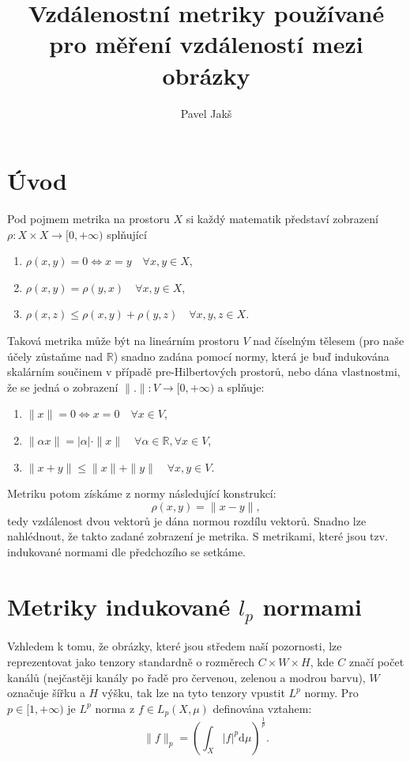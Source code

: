 \documentclass[czech]{article}
\author{Pavel Jakš}
\title{Vzdálenostní metriky používané pro měření vzdáleností mezi obrázky}
\begin{document}
\maketitle

\section*{Úvod}

Pod pojmem metrika na prostoru $X$ si každý matematik představí zobrazení $\rho : X \times X \rightarrow [0, + \infty)$
splňující
\begin{enumerate}
    \item $\rho(x, y) = 0 \iff x = y \quad \forall x, y \in X$,
    \item $\rho(x, y) = \rho(y, x) \quad \forall x, y \in X$,
    \item $\rho(x, z) \leq \rho(x, y) + \rho(y, z) \quad \forall x, y, z \in X$.
\end{enumerate}

Taková metrika může být na lineárním prostoru $V$ nad číselným tělesem (pro naše účely zůstaňme nad $\mathbb{R}$)
snadno zadána pomocí normy,
která je buď indukována skalárním součinem v případě pre-Hilbertových prostorů,
nebo dána vlastnostmi, že se jedná o zobrazení $\|.\| : V \rightarrow [0, + \infty)$
a splňuje:
\begin{enumerate}
    \item $\|x\| = 0 \iff x = 0 \quad \forall x \in V$,
    \item $\|\alpha x\| = |\alpha| \cdot \|x\| \quad \forall \alpha \in \mathbb{R}, \forall x \in V$,
    \item $\|x + y\| \leq \|x\| + \|y\| \quad \forall x, y \in V$.
\end{enumerate}
Metriku potom získáme z normy následující konstrukcí:
\begin{equation*}
    \rho (x, y) = \| x - y \|,
\end{equation*}
tedy vzdálenost dvou vektorů je dána normou rozdílu vektorů.
Snadno lze nahlédnout, že takto zadané zobrazení je metrika.
S metrikami, které jsou tzv. indukované normami dle předchozího se setkáme.


\section{Metriky indukované $l_p$ normami}

Vzhledem k tomu, že obrázky, které jsou středem naší pozornosti,
lze reprezentovat jako tenzory standardně o rozměrech $C \times W \times H$,
kde $C$ značí počet kanálů (nejčastěji kanály po řadě pro červenou, zelenou a modrou barvu),
$W$ označuje šířku a $H$ výšku, tak lze na tyto tenzory vpustit $L^p$ normy.
Pro $p \in [1, + \infty)$ je $L^p$ norma z $f \in L_p(X, \mu )$
definována vztahem:
\begin{equation*}
    \|f\|_p = \left(\int_X |f|^p \mathrm{d} \mu \right)^{\frac{1}{p}}.
\end{equation*}
\end{document}

